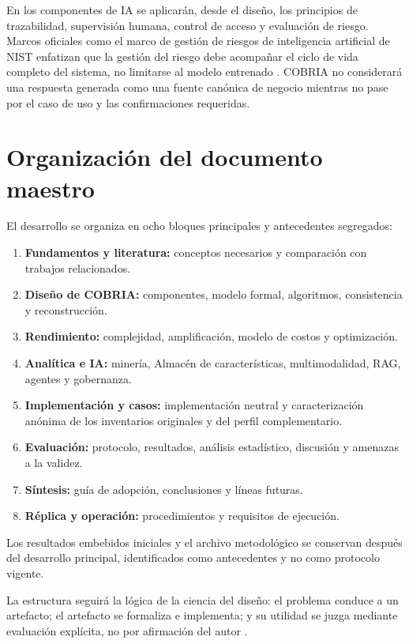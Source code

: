 En los componentes de IA se aplicarán, desde el diseño, los principios de trazabilidad,
supervisión humana, control de acceso y evaluación de riesgo. Marcos oficiales como el
marco de gestión de riesgos de inteligencia artificial de NIST enfatizan que la gestión del riesgo debe acompañar
el ciclo de vida completo del sistema, no limitarse al modelo entrenado
\parencite{nist2023airmf}. COBRIA no considerará una respuesta generada como una fuente
canónica de negocio mientras no pase por el caso de uso y las confirmaciones requeridas.

\section{Organización del documento maestro}

El desarrollo se organiza en ocho bloques principales y antecedentes segregados:

\begin{enumerate}[leftmargin=*]
  \item \textbf{Fundamentos y literatura:} conceptos necesarios y comparación con
  trabajos relacionados.
  \item \textbf{Diseño de COBRIA:} componentes, modelo formal, algoritmos, consistencia
  y reconstrucción.
  \item \textbf{Rendimiento:} complejidad, amplificación, modelo de costos y
  optimización.
  \item \textbf{Analítica e IA:} minería, Almacén de características, multimodalidad, RAG, agentes y
  gobernanza.
  \item \textbf{Implementación y casos:} implementación neutral y caracterización
  anónima de los inventarios originales y del perfil complementario.
  \item \textbf{Evaluación:} protocolo, resultados, análisis estadístico, discusión y
  amenazas a la validez.
  \item \textbf{Síntesis:} guía de adopción, conclusiones y líneas futuras.
  \item \textbf{Réplica y operación:} procedimientos y requisitos de ejecución.
\end{enumerate}

Los resultados embebidos iniciales y el archivo metodológico se conservan después
del desarrollo principal, identificados como antecedentes y no como protocolo vigente.

La estructura seguirá la lógica de la ciencia del diseño: el problema conduce a un
artefacto; el artefacto se formaliza e implementa; y su utilidad se juzga mediante
evaluación explícita, no por afirmación del autor \parencite{hevner2004designscience,
peffers2007dsrm}.

